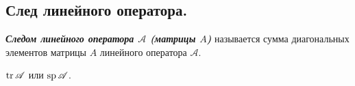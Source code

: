\subsection{
    След линейного оператора.
}

\begin{definition}
    \textbf{\textit{Следом линейного оператора $\mathscr{A}$ (матрицы $A$)}} называется сумма диагональных элементов матрицы $A$ линейного оператора $\mathscr{A}$.
\end{definition}

\begin{designation}
    $\operatorname{\mathop{\mathrm{tr}}} \mathscr{A}$ или $\operatorname{\mathop{\mathrm{sp}}} \mathscr{A}$.
\end{designation}
